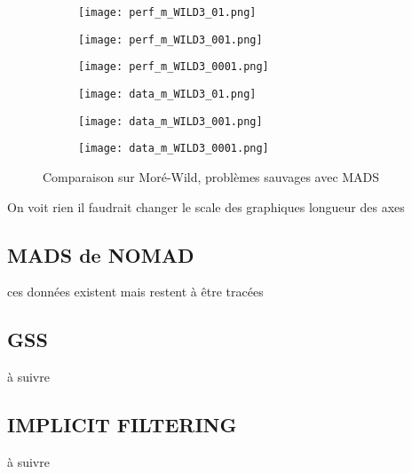 \documentclass[letterpaper]{scrartcl}
\begin{document}
\begin{figure}[!htb] %
	\begin{subfigure}{0.48\textwidth}
		\texttt{[image: perf\_m\_WILD3\_01.png]}
	\end{subfigure}\hspace*{\fill}
	\begin{subfigure}{0.48\textwidth}
		\texttt{[image: perf\_m\_WILD3\_001.png]}
	\end{subfigure}
	\medskip
	\begin{subfigure}{0.48\textwidth}
		\texttt{[image: perf\_m\_WILD3\_0001.png]}
	\end{subfigure}\hspace*{\fill}
	\begin{subfigure}{0.48\textwidth}
		\texttt{[image: data\_m\_WILD3\_01.png]}
	\end{subfigure}
	\medskip
	\begin{subfigure}{0.48\textwidth}
		\texttt{[image: data\_m\_WILD3\_001.png]}
	\end{subfigure}\hspace*{\fill}
	\begin{subfigure}{0.48\textwidth}
		\texttt{[image: data\_m\_WILD3\_0001.png]}
	\end{subfigure}
	\caption{Comparaison sur Moré-Wild, problèmes sauvages avec MADS} \label{fig:12}
\end{figure}
\clearpage
On voit rien il faudrait changer le scale des graphiques longueur des axes
\clearpage
\subsection{MADS de NOMAD}
ces données existent mais restent à être tracées
\subsection{GSS}
à suivre
\subsection{IMPLICIT FILTERING}
à suivre 
\clearpage


\end{document}
